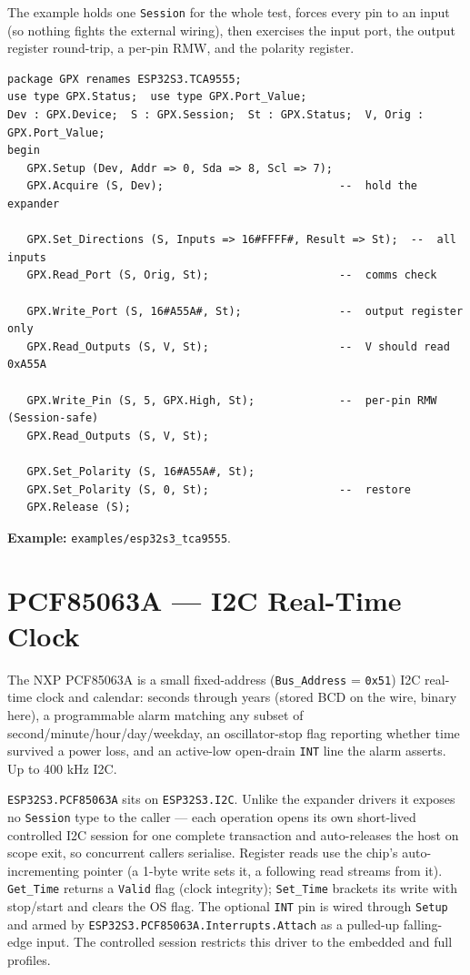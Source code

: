 The example holds one \texttt{Session} for the whole test, forces every pin to an
input (so nothing fights the external wiring), then exercises the input port, the
output register round-trip, a per-pin RMW, and the polarity register.

\begin{lstlisting}
package GPX renames ESP32S3.TCA9555;
use type GPX.Status;  use type GPX.Port_Value;
Dev : GPX.Device;  S : GPX.Session;  St : GPX.Status;  V, Orig : GPX.Port_Value;
begin
   GPX.Setup (Dev, Addr => 0, Sda => 8, Scl => 7);
   GPX.Acquire (S, Dev);                           --  hold the expander

   GPX.Set_Directions (S, Inputs => 16#FFFF#, Result => St);  --  all inputs
   GPX.Read_Port (S, Orig, St);                    --  comms check

   GPX.Write_Port (S, 16#A55A#, St);               --  output register only
   GPX.Read_Outputs (S, V, St);                    --  V should read 0xA55A

   GPX.Write_Pin (S, 5, GPX.High, St);             --  per-pin RMW (Session-safe)
   GPX.Read_Outputs (S, V, St);

   GPX.Set_Polarity (S, 16#A55A#, St);
   GPX.Set_Polarity (S, 0, St);                    --  restore
   GPX.Release (S);
\end{lstlisting}

\noindent\textbf{Example:} \texttt{examples/esp32s3\_tca9555}.

\section{PCF85063A --- I2C Real-Time Clock}
\label{app:ext:pcf85063a}

The NXP PCF85063A is a small fixed-address (\texttt{Bus\_Address} = \texttt{0x51})
I2C real-time clock and calendar: seconds through years (stored BCD on the wire,
binary here), a programmable alarm matching any subset of
second/minute/hour/day/weekday, an oscillator-stop flag reporting whether time
survived a power loss, and an active-low open-drain \texttt{INT} line the alarm
asserts. Up to 400 kHz I2C.

\texttt{ESP32S3.PCF85063A} sits on \texttt{ESP32S3.I2C}. Unlike the expander
drivers it exposes no \texttt{Session} type to the caller --- each operation opens
its own short-lived controlled I2C session for one complete transaction and
auto-releases the host on scope exit, so concurrent callers serialise. Register
reads use the chip's auto-incrementing pointer (a 1-byte write sets it, a following
read streams from it). \texttt{Get\_Time} returns a \texttt{Valid} flag (clock
integrity); \texttt{Set\_Time} brackets its write with stop/start and clears the OS
flag. The optional \texttt{INT} pin is wired through \texttt{Setup} and armed by
\texttt{ESP32S3.PCF85063A.Interrupts.Attach} as a pulled-up falling-edge input. The
controlled session restricts this driver to the embedded and full profiles.

